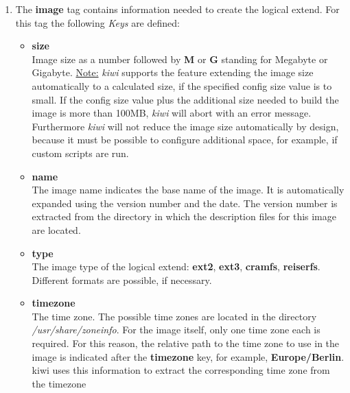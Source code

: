 \begin{itemize}
      \begin{enumerate}
          \item The \textbf{image} tag contains information needed to
          create the logical extend. For this tag the following \textit{Keys}
          are defined:
          \begin{itemize}
              \item \textbf{size}\\
                    Image size as a number followed by  \textbf{M} or \textbf{G}
                    standing for Megabyte or Gigabyte. \underline{Note:}
                    \textit{kiwi} supports the feature extending the image size
                    automatically to a calculated size, if the specified
                    config size value is to small. If the config size value
                    plus the additional size needed to build the image is more
                    than 100MB, \textit{kiwi} will abort with an error message.
                    Furthermore \textit{kiwi} will not reduce the image size
                    automatically by design, because it must be possible to
                    configure additional space, for example, if custom scripts
                    are run.
              \item \textbf{name}\\
                    The image name indicates the base name of the image. It
                    is automatically expanded using the version number and the
                    date. The version number is extracted from the directory
                    in which the description files for this image are located.
              \item \textbf{type}\\
                    The image type of the logical extend: \textbf{ext2},
                    \textbf{ext3}, \textbf{cramfs}, \textbf{reiserfs}.
                    Different formats are possible, if necessary.
              \item \textbf{timezone}\\
                    The time zone. The possible time zones are located in the
                    directory \textit{/usr/share/zoneinfo}. For the image
                    itself, only one time zone each is required. For this
                    reason, the relative path to the time zone to use in the
                    image is indicated after the \textbf{timezone} key, for
                    example, \textbf{Europe/Berlin}. kiwi uses this information
                    to extract the corresponding time zone from the timezone

\end{itemize}
\end{enumerate}
\end{itemize}
